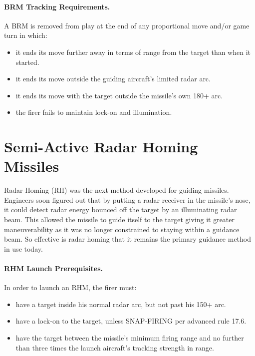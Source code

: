 \paragraph{BRM Tracking Requirements.} A BRM is removed from play at the end of any proportional move and/or game turn in which:

\begin{itemize}

    \item it ends its move further away in terms of range from the target than when it started.

    \item it ends its move outside the guiding aircraft's limited radar arc.

    \item it ends its move with the target outside the missile's own 180+ arc.

    \item the firer fails to maintain lock-on and illumination.

\end{itemize}

\section{Semi-Active Radar Homing Missiles}
\label{rule:semi-active-radar-homing-missiles}

Radar Homing (RH) was the next method developed for guiding missiles. Engineers soon figured out that by putting a radar receiver in the missile's nose, it could detect radar energy bounced off the target by an illuminating radar beam. This allowed the missile to guide itself to the target giving it greater maneuverability as it was no longer constrained to staying within a guidance beam. So effective is radar homing that it remains the primary guidance method in use today.

\paragraph{RHM Launch Prerequisites.} In order to launch an RHM, the firer must:

\begin{itemize}

    \item have a target inside his normal radar arc, but not past his 150+ arc.

    \item have a lock-on to the target, unless SNAP-FIRING per advanced rule 17.6.

    \item have the target between the missile's minimum firing range and no further than three times the launch aircraft's tracking strength in range.

\end{itemize}

